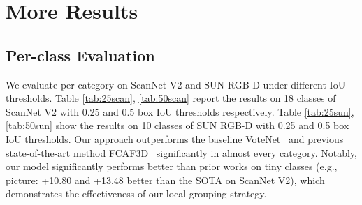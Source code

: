 \documentclass{article}
\begin{document}
\begin{table*}[h]
\large
\centering
\setlength{\abovecaptionskip}{0pt}  
\setlength{\belowcaptionskip}{5pt}
\caption{3D detection scores per category on the SUN RGB-D, evaluated with mAP@0.50 IoU.}
\label{tab:50sun}
\renewcommand{\arraystretch}{1.5}{
}
\end{table*}

\section{More Results}
\label{sec:exp}
\subsection{Per-class Evaluation}
\label{sec:per-class}
We evaluate per-category on ScanNet V2 and SUN RGB-D under different IoU thresholds. Table \ref{tab:25scan}, \ref{tab:50scan} report the results on 18 classes of ScanNet V2 with 0.25 and 0.5 box IoU thresholds respectively. Table \ref{tab:25sun}, \ref{tab:50sun} show the results on 10 classes of SUN RGB-D with 0.25 and 0.5 box IoU thresholds. Our approach outperforms the baseline VoteNet~\cite{qi2020imvotenet} and previous state-of-the-art method FCAF3D~\cite{rukhovich2021fcaf3d} significantly in almost every category. Notably, our model significantly performs better than prior works on tiny classes (e.g., picture: +10.80 and +13.48 better than the SOTA on ScanNet V2), which demonstrates the effectiveness of our local grouping strategy.
\end{document}
